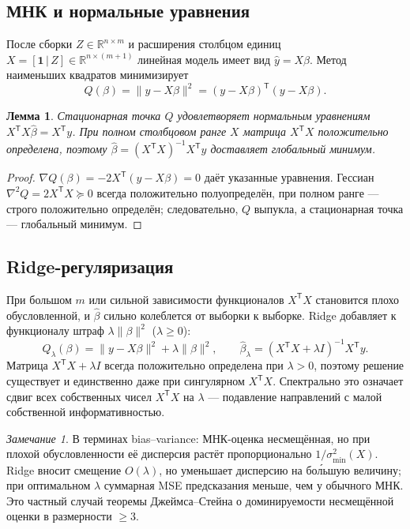 \documentclass[12pt,a4paper]{article}
\newtheorem{lemma}{Лемма}
\theoremstyle{definition}
\theoremstyle{remark}
\newtheorem{remark}{Замечание}
\newcommand{\R}{\mathbb{R}}
\newcommand{\norm}[1]{\lVert#1\rVert}
\newcommand{\T}{^{\mathsf{T}}}
\begin{document}
\subsection{МНК и нормальные уравнения}

После сборки $Z\in\R^{n\times m}$ и расширения столбцом единиц
$X=[\mathbf{1}\,|\,Z]\in\R^{n\times(m+1)}$ линейная модель имеет вид
$\hat y=X\beta$. Метод наименьших квадратов минимизирует
\[
    Q(\beta)=\norm{y-X\beta}^{2}=(y-X\beta)\T(y-X\beta).
\]

\begin{lemma}
Стационарная точка $Q$ удовлетворяет нормальным уравнениям
$X\T X\hat\beta=X\T y$. При полном столбцовом ранге $X$ матрица $X\T X$
положительно определена, поэтому $\hat\beta=(X\T X)^{-1}X\T y$ доставляет
\emph{глобальный} минимум.
\end{lemma}

\begin{proof}
$\nabla Q(\beta)=-2X\T(y-X\beta)=0$ даёт указанные уравнения. Гессиан
$\nabla^{2}Q=2X\T X\succeq 0$ всегда положительно полуопределён, при
полном ранге --- строго положительно определён; следовательно, $Q$ выпукла,
а стационарная точка --- глобальный минимум.
\end{proof}

\subsection{Ridge-регуляризация}

При большом $m$ или сильной зависимости функционалов $X\T X$ становится
плохо обусловленной, и $\hat\beta$ сильно колеблется от выборки к выборке.
Ridge добавляет к функционалу штраф $\lambda\norm{\beta}^{2}$ ($\lambda\geq 0$):
\[
    Q_{\lambda}(\beta)=\norm{y-X\beta}^{2}+\lambda\norm{\beta}^{2},
    \qquad
    \hat\beta_{\lambda}=(X\T X+\lambda I)^{-1}X\T y.
\]
Матрица $X\T X+\lambda I$ всегда положительно определена при $\lambda>0$,
поэтому решение существует и единственно даже при сингулярном $X\T X$.
Спектрально это означает сдвиг всех собственных чисел $X\T X$ на $\lambda$
--- подавление направлений с малой собственной информативностью.

\begin{remark}
В терминах bias--variance: МНК-оценка несмещённая, но при плохой
обусловленности её дисперсия растёт пропорционально $1/\sigma_{\min}^{2}(X)$.
Ridge вносит смещение $O(\lambda)$, но уменьшает дисперсию на бо\'льшую
величину; при оптимальном $\lambda$ суммарная MSE предсказания меньше, чем у
обычного МНК. Это частный случай теоремы Джеймса--Стейна о доминируемости
несмещённой оценки в размерности $\geq 3$.
\end{remark}
\end{document}
